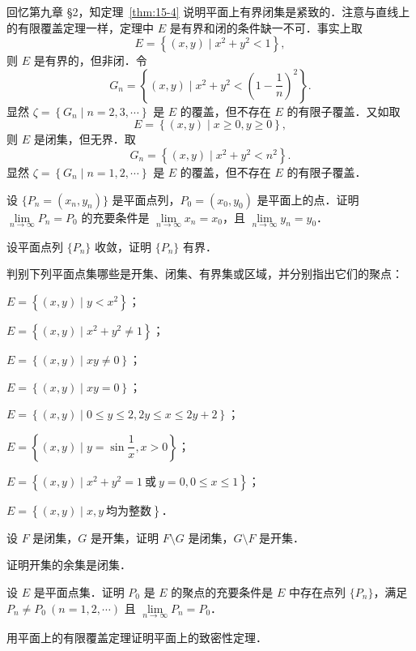 回忆第九章 §2，知定理~\ref{thm:15-4} 说明平面上有界闭集是紧致的．注意与直线上的有限覆盖定理一样，定理中 $E$ 是有界和闭的条件缺一不可．事实上取
\[
E=\left\{(x,y)\mid x^{2}+y^{2}<1\right\},
\]
则 $E$ 是有界的，但非闭．令
\[
G_{n}=\left\{(x,y)\mid x^{2}+y^{2}<\left(1-\frac{1}{n}\right)^{2}\right\}.
\]
显然 $\zeta=\left\{G_{n}\mid n=2,3,\cdots\right\}$ 是 $E$ 的覆盖，但不存在 $E$ 的有限子覆盖．又如取
\[
E=\left\{(x,y)\mid x\geqslant 0,y\geqslant 0\right\},
\]
则 $E$ 是闭集，但无界．取
\[
G_{n}=\left\{(x,y)\mid x^{2}+y^{2}<n^{2}\right\}.
\]
显然 $\zeta=\left\{G_{n}\mid n=1,2,\cdots\right\}$ 是 $E$ 的覆盖，但不存在 $E$ 的有限子覆盖．

\begin{xiti}
\item 设 $\{P_{n}=(x_{n},y_{n})\}$ 是平面点列，$P_{0}=(x_{0},y_{0})$ 是平面上的点．证明 $\lim\limits_{n\to\infty}P_{n}=P_{0}$ 的充要条件是 $\lim\limits_{n\to\infty}x_{n}=x_{0}$，且 $\lim\limits_{n\to\infty}y_{n}=y_{0}$．
\item 设平面点列 $\{P_{n}\}$ 收敛，证明 $\{P_{n}\}$ 有界．
\item 判别下列平面点集哪些是开集、闭集、有界集或区域，并分别指出它们的聚点：
\begin{ziti}
\item $E=\left\{(x,y)\mid y<x^{2}\right\}$；
\item $E=\left\{(x,y)\mid x^{2}+y^{2}\neq 1\right\}$；
\item $E=\left\{(x,y)\mid xy\neq 0\right\}$；
\item $E=\left\{(x,y)\mid xy=0\right\}$；
\item $E=\left\{(x,y)\mid 0\leqslant y\leqslant 2,2y\leqslant x\leqslant 2y+2\right\}$；
\item $E=\left\{(x,y)\mid y=\sin\dfrac{1}{x},x>0\right\}$；
\item $E=\left\{(x,y)\mid x^{2}+y^{2}=1\ \text{或}\ y=0,0\leqslant x\leqslant 1\right\}$；
\item $E=\left\{(x,y)\mid x,y\ \text{均为整数}\right\}$．
\end{ziti}
\item 设 $F$ 是闭集，$G$ 是开集，证明 $F\setminus G$ 是闭集，$G\setminus F$ 是开集．
\item 证明开集的余集是闭集．
\item 设 $E$ 是平面点集．证明 $P_{0}$ 是 $E$ 的聚点的充要条件是 $E$ 中存在点列 $\{P_{n}\}$，满足 $P_{n}\neq P_{0}\ (n=1,2,\cdots)$ 且 $\lim\limits_{n\to\infty}P_{n}=P_{0}$．
\item 用平面上的有限覆盖定理证明平面上的致密性定理．

\end{xiti}
